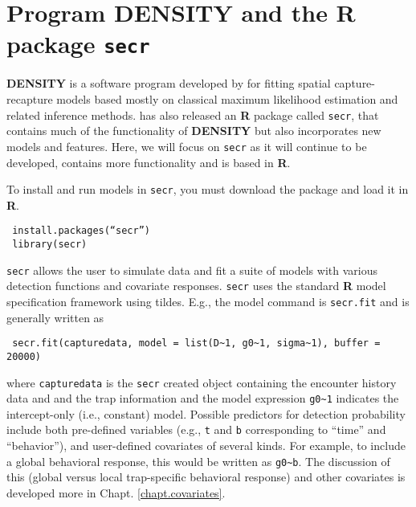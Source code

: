 {\begin{comment}
\subsection{
Exercises
}

{\flushleft
1.	Compute the 95\% confidence interval for wolverine density,
somehow. Comment on the practical implication of this level of precision.
}

{\flushleft
2.	Compute the AIC of this model and modify \mbox{\tt intlik3}
 to consider alternative link functions (at least one additional) and
 compare the  AIC of the different models and the estimates. Comment. 
}
\end{comment}


\section{Program DENSITY and the R package \mbox{\tt secr} }
\label{mle.sec.secr}

{\bf DENSITY} is a software program developed by \citet{efford:2004}
for fitting spatial capture-recapture models based mostly on classical
maximum likelihood estimation and related inference methods.
\citet{efford:2011} has also released an {\bf R} package called
\mbox{\tt secr}, that contains much of the functionality of {\bf
  DENSITY} but also incorporates new models and features.  Here, we
will focus on \mbox{\tt secr} as it will continue to be developed,
contains more functionality and is based in {\bf R}.

To install
and run models in \mbox{\tt secr}, you must download the package and
load it in
{\bf R}.
\begin{verbatim}
 install.packages(“secr”)
 library(secr)
\end{verbatim}
\mbox{\tt secr} allows the user to simulate data and fit a suite of models with
various detection functions and covariate responses.  \mbox{\tt secr}
uses the
standard {\bf R} model specification framework using tildes. E.g., the model
command is \mbox{\tt secr.fit} and is generally written as
\begin{verbatim}
 secr.fit(capturedata, model = list(D~1, g0~1, sigma~1), buffer = 20000)
\end{verbatim}
where \mbox{\tt capturedata} is the \mbox{\tt secr} created object containing the encounter history data and 
and the trap information and 
the model expression \verb#g0~1# indicates the intercept-only (i.e., constant) model. 
 Possible predictors for detection probability include both
pre-defined variables (e.g., \mbox{\tt t} and \mbox{\tt b}
corresponding to ``time'' and 
``behavior''), and user-defined covariates of several kinds. 
For example, to include a global behavioral response, this would be written
as \verb#g0~b#.   
The discussion of this (global versus local trap-specific behavioral response) and other covariates 
is developed more in Chapt. \ref{chapt.covariates}.

}
